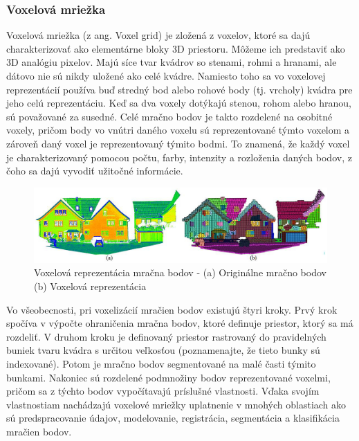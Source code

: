 \subsubsection{Voxelová mriežka}
\noindent Voxelová mriežka (z ang. Voxel grid) je zložená z voxelov, ktoré sa dajú charakterizovať ako elementárne bloky 3D priestoru. Môžeme ich predstaviť ako 3D analógiu pixelov. Majú síce tvar kvádrov so stenami, rohmi a hranami, ale dátovo nie sú nikdy uložené ako celé kvádre. Namiesto toho sa vo voxelovej reprezentácií používa buď stredný bod alebo rohové body (tj. vrcholy) kvádra pre jeho celú reprezentáciu. Keď sa dva voxely dotýkajú stenou, rohom alebo hranou, sú považované za susedné. Celé mračno bodov je takto rozdelené na osobitné voxely, pričom body vo vnútri daného voxelu sú reprezentované týmto voxelom a zároveň daný voxel je reprezentovaný týmito bodmi. To znamená, že každý voxel je charakterizovaný pomocou počtu, farby, intenzity a rozloženia daných bodov, z čoho sa dajú vyvodiť užitočné informácie. \cite{voxel_grid} 
\begin{figure}[!htbp]
  \centering
  \includegraphics[width=15cm]{img/pc_vs_vox.jpg}
  \caption{Voxelová reprezentácia mračna bodov - (a) Originálne mračno bodov (b) Voxelová reprezentácia \cite{voxel_grid}}
  \label{vzhladobr}
\end{figure}
\newline\indent Vo všeobecnosti, pri voxelizácií mračien bodov existujú štyri kroky. Prvý krok spočíva v výpočte ohraničenia mračna bodov, ktoré definuje priestor, ktorý sa má rozdeliť. V druhom kroku je definovaný priestor rastrovaný do pravidelných buniek tvaru kvádra s určitou veľkosťou (poznamenajte, že tieto bunky sú indexované). Potom je mračno bodov segmentované na malé časti týmito bunkami. Nakoniec sú rozdelené podmnožiny bodov reprezentované voxelmi, pričom sa z týchto bodov vypočítavajú príslušné vlastnosti. \cite{voxel_grid}
\newline\indent Vďaka svojím vlastnostiam nachádzajú voxelové mriežky uplatnenie v mnohých oblastiach ako sú predspracovanie údajov, modelovanie, registrácia, segmentácia a klasifikácia mračien bodov. 

